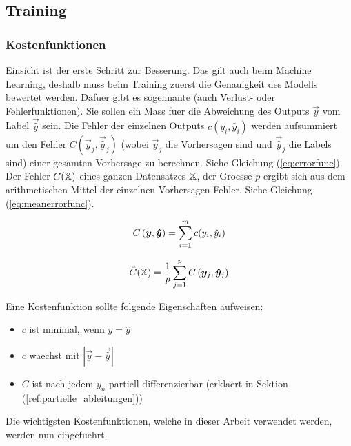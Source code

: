 \documentclass[../main]{subfiles}
\begin{document}
\subsection{Training}
\subsubsection{Kostenfunktionen}
Einsicht ist der erste Schritt zur Besserung. Das gilt auch beim Machine Learning, deshalb muss beim Training zuerst die Genauigkeit des Modells bewertet werden.
Dafuer gibt es sogennante  (auch Verlust- oder
Fehlerfunktionen).
Sie sollen ein Mass fuer die Abweichung des Outputs $\vec{y}$ vom Label $\vec{\hat{y}}$ sein.
\para{}
Die Fehler der einzelnen Outputs $c(y_i,\hat{y}_i)$ werden aufsummiert um den
Fehler $C(\vec{y}_j,\vec{\hat{y}}_j)$ (wobei $\vec{y}_j$ die Vorhersagen sind und
$\vec{\hat{y}}_j$ die Labels sind) einer gesamten Vorhersage zu berechnen. Siehe Gleichung (\ref{eq:errorfunc}).\\
Der Fehler $\bar{C}(\mathbb{X})$ eines ganzen Datensatzes $\mathbb{X}$, der
Groesse $p$ ergibt sich aus dem arithmetischen
Mittel der einzelnen Vorhersagen-Fehler. Siehe Gleichung (\ref{eq:meanerrorfunc}).
\para{}
\begin{minipage}[h!]{0.5\textwidth}
  \centering
  \begin{equation}\label{eq:errorfunc}
    C \left(\bm{y},\bm{\hat{y}} \right)=\displaystyle\sum_{i=1}^{m} c(y_i, \hat{y}_i)
  \end{equation}
\end{minipage}
\begin{minipage}[h!]{0.5\textwidth}
  \centering
  \begin{equation}\label{eq:meanerrorfunc}
    \bar{C}(\mathbb{X}) = \frac{1}{p}\displaystyle\sum_{j=1}^{p} C\left(\bm{y}_j,\bm{\hat{y}}_j\right)
  \end{equation}
\end{minipage}
\para{}
Eine Kostenfunktion sollte folgende Eigenschaften aufweisen:
\begin{itemize}
\item{$c$ ist minimal, wenn $y = \hat{y}$}
\item{$c$ waechst mit $|\vec{y}-\vec{\hat{y}}|$}
\item{$C$ ist nach jedem $y_n$ partiell differenzierbar (erklaert in Sektion (\ref{ref:partielle_ableitungen}))}
\end{itemize}

\para{}
Die wichtigsten Kostenfunktionen, welche in dieser Arbeit verwendet werden,
werden nun eingefuehrt.
\end{document}
